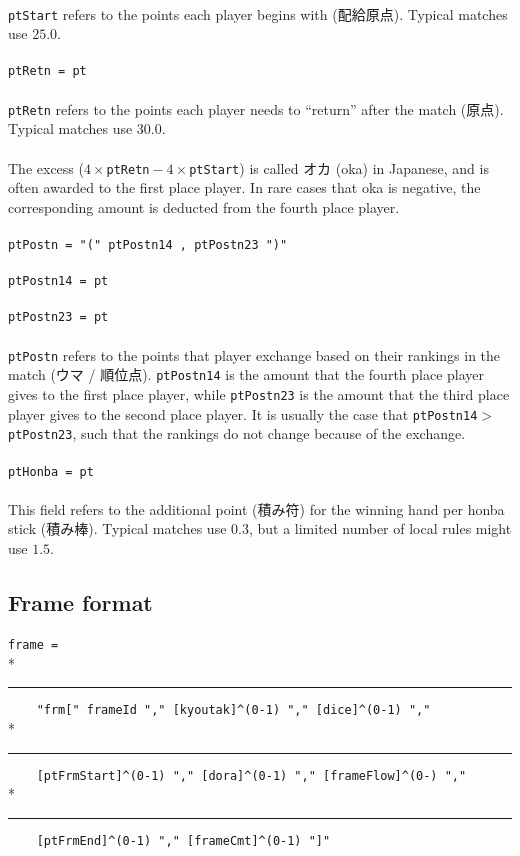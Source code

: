 \documentclass[%
	a4paper%
	,10pt%
	,twoside%
	,notitlepage%
]{article}%
\newcommand*{\ruleSymbol}{\textjapanese{⚠}}%
\newcommand*{\ruleMargin}{\marginpar{\flushright{}\ruleSymbol{}}}%
\newcommand*{\rulePar}{\paragraph*{\ruleMargin{}}}%
\newcommand*{\indentRule}{\rule{10pt}{0pt}}%
\begin{document}
			\paragraph*{}\lstinline/ptStart/ refers to the points each player begins with (\textjapanese{配給原点}). Typical matches use $25.0$. %
			\rulePar{}\lstinline/ptRetn = pt/%
			\paragraph*{}\lstinline/ptRetn/ refers to the points each player needs to ``return'' after the match (\textjapanese{原点}). Typical matches use $30.0$. %
			\paragraph*{}The excess ($4 \times{} {}$\lstinline/ptRetn/${} - 4 \times{} {}$\lstinline/ptStart/) is called \textjapanese{オカ} (oka) in Japanese, and is often awarded to the first place player. In rare cases that oka is negative, the corresponding amount is deducted from the fourth place player. %
			\rulePar{}\lstinline/ptPostn = "(" ptPostn14 , ptPostn23 ")"/%
			\rulePar{}\lstinline/ptPostn14 = pt/%
			\rulePar{}\lstinline/ptPostn23 = pt/%
			\paragraph*{}\lstinline/ptPostn/ refers to the points that player exchange based on their rankings in the match (\textjapanese{ウマ} / \textjapanese{順位点}). \lstinline/ptPostn14/ is the amount that the fourth place player gives to the first place player, while \lstinline/ptPostn23/ is the amount that the third place player gives to the second place player. It is usually the case that \lstinline/ptPostn14/${} > {}$\lstinline/ptPostn23/, such that the rankings do not change because of the exchange. %
			\rulePar{}\lstinline/ptHonba = pt/%
			\paragraph*{}This field refers to the additional point (\textjapanese{積み符}) for the winning hand per honba stick (\textjapanese{積み棒}). Typical matches use $0.3$, but a limited number of local rules might use $1.5$. %
	\subsection{Frame format}\label{subsec:frame}%
		\rulePar{}\lstinline/frame = /\\*{}%
		\indentRule{}\lstinline/    "frm[" frameId "," [kyoutak]^(0-1) "," [dice]^(0-1) "," /\\*{}%
		\indentRule{}\lstinline/    [ptFrmStart]^(0-1) "," [dora]^(0-1) "," [frameFlow]^(0-) "," /\\*{}%
		\indentRule{}\lstinline/    [ptFrmEnd]^(0-1) "," [frameCmt]^(0-1) "]"/%
\end{document}
